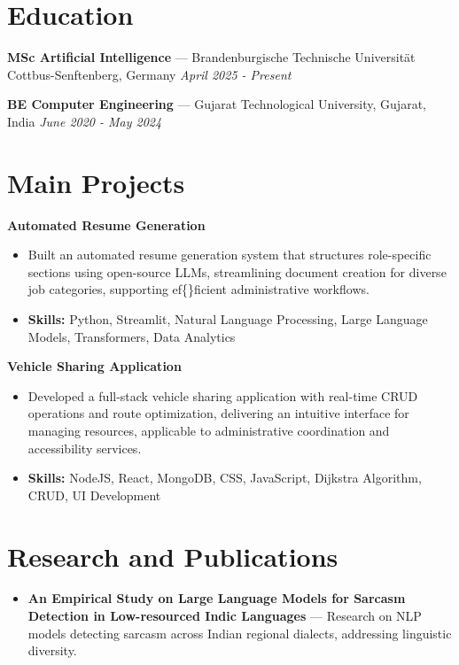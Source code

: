 \documentclass[a4paper,10pt]{article}
\begin{document}
\section*{Education}
\textbf{MSc Artificial Intelligence} — Brandenburgische Technische Universität Cottbus-Senftenberg, Germany \hfill \textit{April 2025 - Present}\par
\vspace{1.5pt}
\textbf{BE Computer Engineering} — Gujarat Technological University, Gujarat, India \hfill \textit{June 2020 - May 2024}\par

\section*{Main Projects}
\textbf{Automated Resume Generation}\par
\vspace{1pt}
\begin{itemize}
  \item Built an automated resume generation system that structures role-specific sections using open-source LLMs, streamlining document creation for diverse job categories, supporting ef\{\}ficient administrative workflows.
  \item \textbf{Skills:} Python, Streamlit, Natural Language Processing, Large Language Models, Transformers, Data Analytics
\end{itemize}
\vspace{3pt}
\textbf{Vehicle Sharing Application}\par
\vspace{1pt}
\begin{itemize}
  \item Developed a full-stack vehicle sharing application with real-time CRUD operations and route optimization, delivering an intuitive interface for managing resources, applicable to administrative coordination and accessibility services.
  \item \textbf{Skills:} NodeJS, React, MongoDB, CSS, JavaScript, Dijkstra Algorithm, CRUD, UI Development
\end{itemize}

\section*{Research and Publications}
\begin{itemize}
\item \textbf{An Empirical Study on Large Language Models for Sarcasm Detection in Low-resourced Indic Languages} — Research on NLP models detecting sarcasm across Indian regional dialects, addressing linguistic diversity.
\end{itemize}
\end{document}
